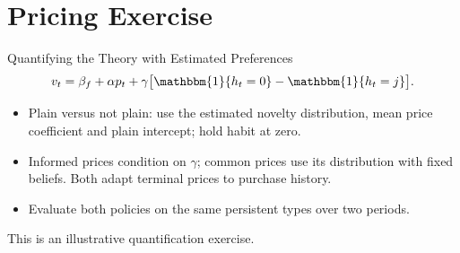 \documentclass[aspectratio=169,professionalfonts]{beamer}
\newcommand{\shortbuttons}{}
\begin{document}
\section{Pricing Exercise}

\gdef\shortbuttons{\hyperlink{short-theory-mapping}{\beamergotobutton{Parameter mapping}}}
\begin{frame}[label=short-34]{Quantifying the Theory with Estimated Preferences}
  \small
  \[
    v_t=\beta_f+\alpha p_t+\gamma\big[\mathbbm{1}\{h_t=0\}-\mathbbm{1}\{h_t=j\}\big].
  \]
  \begin{itemize}
    \item Plain versus not plain: use the estimated novelty distribution, mean price coefficient and plain intercept; hold habit at zero.
    \item Informed prices condition on $\gamma$; common prices use its distribution with fixed beliefs. Both adapt terminal prices to purchase history.
    \item Evaluate both policies on the same persistent types over two periods.
  \end{itemize}
  \medskip
  This is an illustrative quantification exercise.
\end{frame}

\gdef\shortbuttons{}
\end{document}
